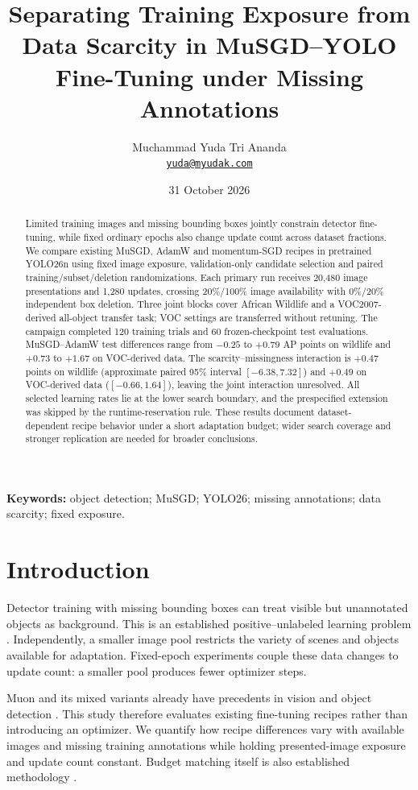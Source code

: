 \documentclass[11pt,a4paper]{article}
\title{Separating Training Exposure from Data Scarcity in MuSGD--YOLO Fine-Tuning under Missing Annotations}
\author{Muchammad Yuda Tri Ananda\\[3pt]\normalsize\href{mailto:yuda@myudak.com}{\texttt{yuda@myudak.com}}}
\date{31 October 2026}
\begin{document}
\maketitle
\thispagestyle{plain}
\begin{abstract}
Limited training images and missing bounding boxes jointly constrain detector fine-tuning, while fixed ordinary epochs also change update count across dataset fractions. We compare existing MuSGD, AdamW and momentum-SGD recipes in pretrained YOLO26n using fixed image exposure, validation-only candidate selection and paired training/subset/deletion randomizations. Each primary run receives 20,480 image presentations and 1,280 updates, crossing 20\%/100\% image availability with 0\%/20\% independent box deletion. Three joint blocks cover African Wildlife and a VOC2007-derived all-object transfer task; VOC settings are transferred without retuning. The campaign completed 120 training trials and 60 frozen-checkpoint test evaluations. MuSGD--AdamW test differences range from $-0.25$ to $+0.79$ AP points on wildlife and $+0.73$ to $+1.67$ on VOC-derived data. The scarcity--missingness interaction is $+0.47$ points on wildlife (approximate paired 95\% interval $[-6.38,7.32]$) and $+0.49$ on VOC-derived data ($[-0.66,1.64]$), leaving the joint interaction unresolved. All selected learning rates lie at the lower search boundary, and the prespecified extension was skipped by the runtime-reservation rule. These results document dataset-dependent recipe behavior under a short adaptation budget; wider search coverage and stronger replication are needed for broader conclusions.
\end{abstract}
\noindent\textbf{Keywords:} object detection; MuSGD; YOLO26; missing annotations; data scarcity; fixed exposure.


\section{Introduction}
Detector training with missing bounding boxes can treat visible but unannotated objects as background. This is an established positive--unlabeled learning problem \cite{yang2020}. Independently, a smaller image pool restricts the variety of scenes and objects available for adaptation. Fixed-epoch experiments couple these data changes to update count: a smaller pool produces fewer optimizer steps.

Muon and its mixed variants already have precedents in vision and object detection \cite{jordan2024,jocher2026,huang2026}. This study therefore evaluates existing fine-tuning recipes rather than introducing an optimizer. We quantify how recipe differences vary with available images and missing training annotations while holding presented-image exposure and update count constant. Budget matching itself is also established methodology \cite{akhtar2026}.
\end{document}
